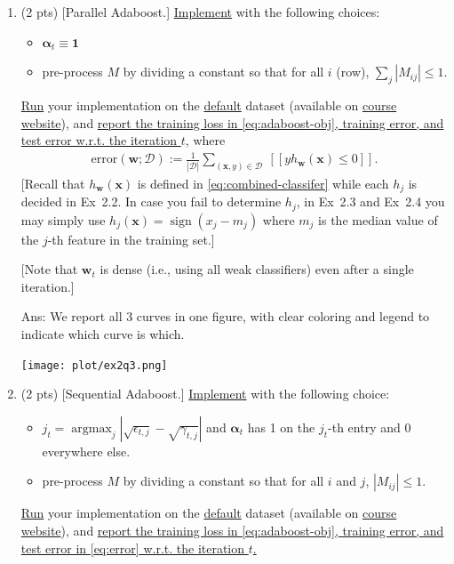 \documentclass[10pt]{article}
\newcommand{\wv}{\mathbf{w}}
\newcommand{\xv}{\mathbf{x}}
\newcommand{\Dc}{\mathcal{D}}
\newcommand{\alphav}{\boldsymbol{\alpha}}
\newcommand{\ans}[1]{{\color{blue}\textsf{Ans}: #1}}
\newcommand{\argmax}{\mathop{\mathrm{argmax}}}
\newcommand{\one}{\mathbf{1}}
\newcommand{\pred}[1]{[\![#1]\!]}
\newcommand{\sign}{\mathop{\mathrm{sign}}}
\begin{document}
\begin{exercise}
\begin{enumerate}
		\item (2 pts) [Parallel Adaboost.] \uline{Implement}  with the following choices:
		      \begin{itemize}
			      \item $\alphav_t \equiv \one$
			      \item pre-process $M$ by dividing a constant so that for all $i$ (row), $\sum_j |M_{ij}| \leq 1$.
		      \end{itemize}
		      \uline{Run} your implementation on the \href{https://archive.ics.uci.edu/dataset/350/default+of+credit+card+clients}{default} dataset (available on \href{https://cs.uwaterloo.ca/~y328yu/mycourses/480/assignment.html}{course website}), and \uline{report the training loss in \eqref{eq:adaboost-obj}, training error, and test error w.r.t. the iteration $t$,} where
		      \begin{align}
			      \label{eq:error}
			      \mathrm{error}(\wv; \Dc) := \frac{1}{|\Dc|}\sum_{ (\xv, y) \in \Dc} ~\pred{y h_{\wv}(\xv) \leq 0}.
		      \end{align}
		      [Recall that $h_\wv(\xv)$ is defined in \eqref{eq:combined-classifer} while each $h_j$ is decided in Ex~2.2. In case you fail to determine $h_j$, in Ex~2.3 and Ex~2.4 you may simply use $h_j(\xv) = \sign(x_j-m_j)$ where $m_j$ is the median value of the $j$-th feature in the training set.]

		      [Note that $\wv_t$ is dense (i.e., using all weak classifiers) even after a single iteration.]

		      \ans{
			      We report all 3 curves in one figure, with clear coloring and legend to indicate which curve is which.
			      \begin{center}
				      \texttt{[image: plot/ex2q3.png]}
			      \end{center}
		      }

		\item (2 pts) [Sequential Adaboost.]  \uline{Implement}  with the following choice:
		      \begin{itemize}
			      \item $j_t = \argmax_j | \sqrt{\epsilon_{t,j}} - \sqrt{\gamma_{t,j}} |$ and $\alphav_t$ has 1 on the $j_t$-th entry and 0 everywhere else.
			      \item pre-process $M$ by dividing a constant so that for all $i$ and $j$, $|M_{ij}| \leq 1$.
		      \end{itemize}
		      \uline{Run} your implementation on the \href{https://archive.ics.uci.edu/dataset/350/default+of+credit+card+clients}{default} dataset (available on \href{https://cs.uwaterloo.ca/~y328yu/mycourses/480/assignment.html}{course website}), and \uline{report the training loss in \eqref{eq:adaboost-obj}, training error, and test error in \eqref{eq:error} w.r.t. the iteration $t$.}


\end{enumerate}
\end{exercise}
\end{document}
